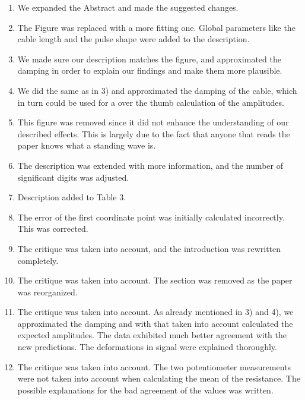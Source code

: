\documentclass[a4paper,10pt]{article}
\begin{document}
\begin{enumerate}  
    \item We expanded the Abstract and made the suggested changes.

    \item The Figure was replaced with a more fitting one.
    Global parameters like the cable length and the pulse shape were added to the description.
    
    \item We made sure our description matches the figure, and approximated the damping in order to explain our findings
    and make them more plausible.
    
    \item We did the same as in 3) and approximated the damping of the cable, which in turn could be used for a over the thumb calculation of the 
    amplitudes.

    \item This figure was removed since it did not enhance the understanding of our described effects.
    This is largely due to the fact that anyone that reads the paper knows what a standing wave is.

    \item The description was extended with more information, and the number of significant digits was
    adjusted.

    \item Description added to Table 3.

    \item The error of the first coordinate point was initially calculated incorrectly.
    This was corrected.

    \item The critique was taken into account, and the introduction was rewritten completely.

    \item The critique was taken into account.
    The section was removed as the paper was reorganized.

    \item The critique was taken into account.
    As already mentioned in 3) and 4), we approximated the damping and with that taken into account 
    calculated the expected amplitudes.
    The data exhibited much better agreement with the new predictions.
    The deformations in signal were explained thoroughly.

    \item The critique was taken into account.
    The two potentiometer measurements were not taken into account when calculating the mean of the resistance.
    The possible explanations for the bad agreement of the values was written.


\end{enumerate}
\end{document}
